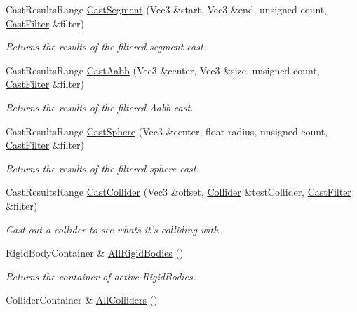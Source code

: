 \begin{DoxyCompactItemize}
Cast\-Results\-Range \hyperlink{classDCEngine_1_1Components_1_1PhysicsSpace_aeec86778252fdad28106c9c67bd6a455}{Cast\-Segment} (Vec3 \&start, Vec3 \&end, unsigned count, \hyperlink{structDCEngine_1_1CastFilter}{Cast\-Filter} \&filter)
\begin{DoxyCompactList}\small\item\em Returns the results of the filtered segment cast. \end{DoxyCompactList}\item 
Cast\-Results\-Range \hyperlink{classDCEngine_1_1Components_1_1PhysicsSpace_a90d4050da54d553942a6364ad7639c7a}{Cast\-Aabb} (Vec3 \&center, Vec3 \&size, unsigned count, \hyperlink{structDCEngine_1_1CastFilter}{Cast\-Filter} \&filter)
\begin{DoxyCompactList}\small\item\em Returns the results of the filtered Aabb cast. \end{DoxyCompactList}\item 
Cast\-Results\-Range \hyperlink{classDCEngine_1_1Components_1_1PhysicsSpace_a042e74d04a2849229d01e62a222d6e0b}{Cast\-Sphere} (Vec3 \&center, float radius, unsigned count, \hyperlink{structDCEngine_1_1CastFilter}{Cast\-Filter} \&filter)
\begin{DoxyCompactList}\small\item\em Returns the results of the filtered sphere cast. \end{DoxyCompactList}\item 
Cast\-Results\-Range \hyperlink{classDCEngine_1_1Components_1_1PhysicsSpace_a3f659d999f3d8bb108ab6b79d2acd6d8}{Cast\-Collider} (Vec3 \&offset, \hyperlink{classDCEngine_1_1Components_1_1Collider}{Collider} \&test\-Collider, \hyperlink{structDCEngine_1_1CastFilter}{Cast\-Filter} \&filter)
\begin{DoxyCompactList}\small\item\em Cast out a collider to see whats it's colliding with. \end{DoxyCompactList}\item 
Rigid\-Body\-Container \& \hyperlink{classDCEngine_1_1Components_1_1PhysicsSpace_a88177dacf87c8e402b79b69b3fa6656d}{All\-Rigid\-Bodies} ()
\begin{DoxyCompactList}\small\item\em Returns the container of active Rigid\-Bodies. \end{DoxyCompactList}\item 
Collider\-Container \& \hyperlink{classDCEngine_1_1Components_1_1PhysicsSpace_ade290d5a9c8813dd000a33c3ad26d9bb}{All\-Colliders} ()

\end{DoxyCompactItemize}
